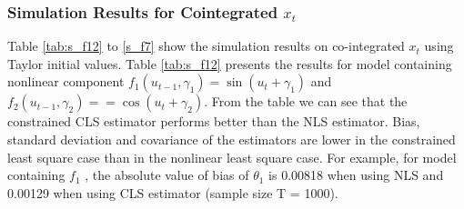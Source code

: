 \documentclass[a4paper,12pt,times,numbered,print,index]{report}
\numberwithin{equation}{section}
\begin{document}
\subsubsection{Simulation Results for Cointegrated $x_t$}
Table \ref{tab:s_f12} to \ref{s_f7} show the simulation results on co-integrated $x_t$ using Taylor initial values.  Table \ref{tab:s_f12} presents the results for model containing nonlinear component $f_1(u_{t-1}, \gamma_1) = \sin(u_t+\gamma_{1})$ and $f_2(u_{t-1}, \gamma_2) = = \cos(u_t+\gamma_{2})$. From the table we can see that the constrained CLS estimator performs better than the NLS estimator. Bias, standard deviation and covariance of the estimators are lower in the constrained least square case than in the nonlinear least square case. For example, for model containing $f_1$ , the absolute value of bias of $\theta_1$ is 0.00818 when using NLS and 0.00129 when using CLS estimator (sample size T = 1000). 
\end{document}
